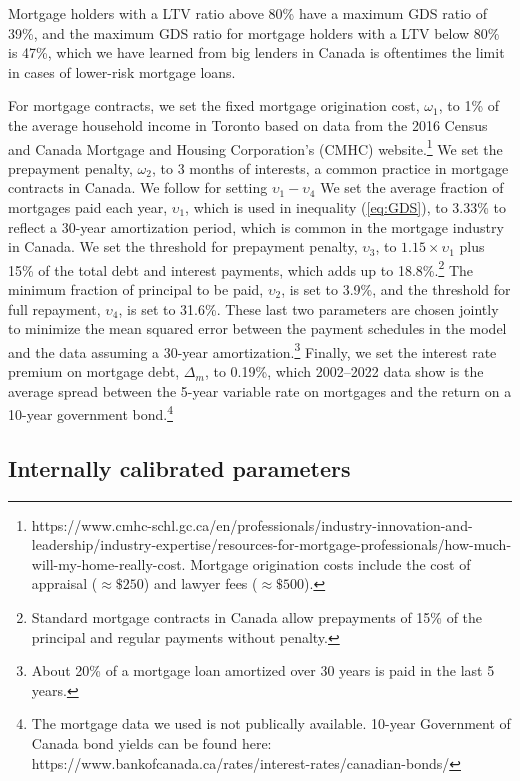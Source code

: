 \documentclass[parskip=full]{article}
\begin{document}
\noindent Mortgage holders with a LTV ratio above 80\% have a maximum GDS ratio of 39\%, and the maximum GDS ratio for mortgage holders with a LTV below 80\% is 47\%, which we have learned from big lenders in Canada is oftentimes the limit in cases of lower-risk mortgage loans. 

For mortgage contracts, we set the fixed mortgage origination cost, $\omega_{1}$, to 1\% of the average household income in Toronto based on data from the 2016 Census and Canada Mortgage and Housing Corporation's (CMHC) website.\footnote{https://www.cmhc-schl.gc.ca/en/professionals/industry-innovation-and-leadership/industry-expertise/resources-for-mortgage-professionals/how-much-will-my-home-really-cost. Mortgage origination costs include the cost of appraisal ($\approx\$250$) and lawyer fees ($\approx\$500$).} We set the prepayment penalty, $\omega_{2}$, to 3 months of interests, a common practice in mortgage contracts in Canada. We follow \citet{rs-2023} for setting $\upsilon_{1}-\upsilon_{4}$ We set the average fraction of mortgages paid each year, $\upsilon_{1}$, which is used in inequality (\ref{eq:GDS}), to 3.33\% to reflect a 30-year amortization period, which is common in the mortgage industry in Canada. We set the threshold for prepayment penalty, $\upsilon_{3}$, to $1.15 \times \upsilon_{1}$ plus 15\% of the total debt and interest payments, which adds up to 18.8\%.\footnote{Standard mortgage contracts in Canada allow prepayments of 15\% of the principal and regular payments without penalty.} The minimum fraction of principal to be paid, $\upsilon_{2}$, is set to 3.9\%, and the threshold for full repayment, $\upsilon_{4}$, is set to 31.6\%. These last two parameters are chosen jointly to minimize the mean squared error between the payment schedules in the model and the data assuming a 30-year amortization.\footnote{About 20\% of a mortgage loan amortized over 30 years is paid in the last 5 years.} Finally, we set the interest rate premium on mortgage debt, $\Delta_{m}$, to 0.19\%, which 2002--2022 data show is the average spread between the 5-year variable rate on mortgages and the return on a 10-year government bond.\footnote{The mortgage data we used is not publically available. 10-year Government of Canada bond yields can be found here: https://www.bankofcanada.ca/rates/interest-rates/canadian-bonds/}

\subsection{Internally calibrated parameters}
\end{document}

